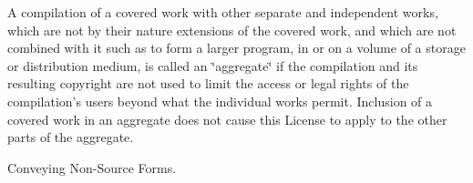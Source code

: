 A compilation of a covered work with other separate and independent works, which are not by their nature extensions of the covered work, and which are not combined with it such as to form a larger program, in or on a volume of a storage or distribution medium, is called an \char`\"{}aggregate\char`\"{} if the compilation and its resulting copyright are not used to limit the access or legal rights of the compilation's users beyond what the individual works permit. Inclusion of a covered work in an aggregate does not cause this License to apply to the other parts of the aggregate.


\begin{DoxyEnumerate}
\item Conveying Non-\/\-Source Forms.
\end{DoxyEnumerate}

